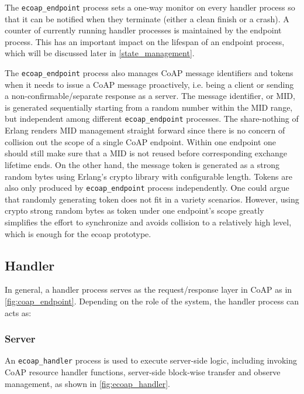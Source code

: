 The \verb|ecoap_endpoint| process sets a one-way monitor on every handler process so that it can be notified when they terminate (either a clean finish or a crash). A counter of currently running handler processes is maintained by the endpoint process. This has an important impact on the lifespan of an endpoint process, which will be discussed later in \autoref{state_management}. 

The \verb|ecoap_endpoint| process also manages CoAP message identifiers and tokens when it needs to issue a CoAP message proactively, i.e. being a client or sending a non-confirmable/separate response as a server. The message identifier, or MID, is generated sequentially starting from a random number within the MID range, but independent among different \verb|ecoap_endpoint| processes. The share-nothing of Erlang renders MID management straight forward since there is no concern of collision out the scope of a single CoAP endpoint. Within one endpoint one should still make sure that a MID is not reused before corresponding exchange lifetime ends. On the other hand, the message token is generated as a strong random bytes using Erlang's crypto library with configurable length. Tokens are also only produced by  \verb|ecoap_endpoint| process independently. One could argue that randomly generating token does not fit in a variety scenarios. However, using crypto strong random bytes as token under one endpoint's scope greatly simplifies the effort to synchronize and avoids collision to a relatively high level, which is enough for the ecoap prototype.

\subsection{Handler}\label{coap_handler}

In general, a handler process serves as the request/response layer in CoAP as in \autoref{fig:coap_endpoint}. Depending on the role of the system, the handler process can acts as:

\subsubsection{Server}

An \verb|ecoap_handler| process is used to execute server-side logic, including invoking CoAP resource handler functions, server-side block-wise transfer and observe management, as shown in \autoref{fig:ecoap_handler}. 

